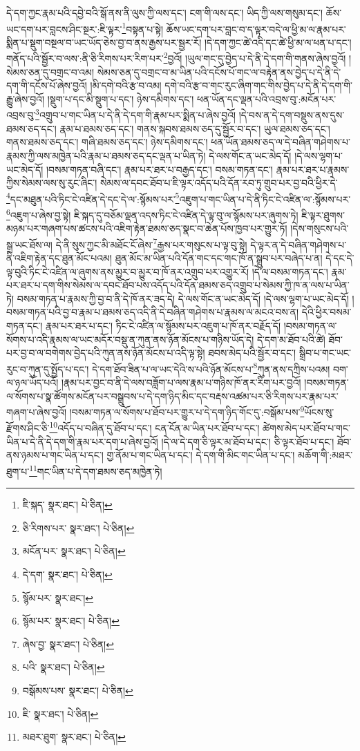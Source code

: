 དེ་དག་ཀྱང་རྣམ་པའི་དབྱེ་བའི་སྒོ་ནས་ནི་ལུས་ཀྱི་ལས་དང་། ངག་གི་ལས་དང་། ཡིད་ཀྱི་ལས་གསུམ་དང་། ཆོས་ཡང་དག་པར་བླངས་ཤིང་སྔར་:ཇི་ལྟར་\footnote{ཇི་སྐད་  སྣར་ཐང་།  པེ་ཅིན། }བསྟན་པ་སྟེ། ཆོས་ཡང་དག་པར་བླང་བ་ད་ལྟར་བདེ་ལ་ཕྱི་མ་ལ་རྣམ་པར་སྨིན་པ་སྡུག་བསྔལ་བ་ཡང་ཡོད་ཅེས་བྱ་བ་ནས་རྒྱས་པར་སྦྱར་རོ། །དེ་དག་ཀྱང་ཚེ་འདི་དང་ཚེ་ཕྱི་མ་ལ་ཕན་པ་དང་། གནོད་པའི་སྦྱོར་བ་ལས་:ནི་ཅི་རིགས་པར་རིག་པར་\footnote{ཅི་རིགས་པར་  སྣར་ཐང་།  པེ་ཅིན། }བྱའོ། །ཡུལ་གང་དུ་བྱེད་པ་དེ་ནི་དེ་དག་གི་གནས་ཞེས་བྱའོ། །སེམས་ཅན་དུ་བགྲང་བ་འམ། སེམས་ཅན་དུ་བགྲང་བ་མ་ཡིན་པའི་དངོས་པོ་གང་ལ་བརྟེན་ནས་བྱེད་པ་དེ་ནི་དེ་དག་གི་དངོས་པོ་ཞེས་བྱའོ། །མི་དགེ་བའི་རྩ་བ་འམ། དགེ་བའི་རྩ་བ་གང་རུང་ཞིག་གང་གིས་བྱེད་པ་དེ་ནི་དེ་དག་གི་རྒྱུ་ཞེས་བྱའོ། །སྡུག་པ་དང་མི་སྡུག་པ་དང་། ཉེས་དམིགས་དང་། ཕན་ཡོན་དང་ལྡན་པའི་འབྲས་བུ་:མངོན་པར་འབྲས་བུ་\footnote{མངོན་པར་  སྣར་ཐང་།  པེ་ཅིན། }འགྲུབ་པ་གང་ཡིན་པ་དེ་ནི་དེ་དག་གི་རྣམ་པར་སྨིན་པ་ཞེས་བྱའོ། །དེ་བས་ན་དེ་དག་བསྡུས་ནས་དུས་ཐམས་ཅད་དང་། རྣམ་པ་ཐམས་ཅད་དང་། གནས་སྐབས་ཐམས་ཅད་དུ་སྦྱོར་བ་དང་། ཡུལ་ཐམས་ཅད་དང་། གནས་ཐམས་ཅད་དང་། གཞི་ཐམས་ཅད་དང་། ཉེས་དམིགས་དང་། ཕན་ཡོན་ཐམས་ཅད་ལ་དེ་བཞིན་གཤེགས་པ་རྣམས་ཀྱི་ལས་མཁྱེན་པའི་རྣམ་པ་ཐམས་ཅད་དང་ལྡན་པ་ཡིན་ཏེ། དེ་ལས་གོང་ན་ཡང་མེད་དོ། །དེ་ལས་ལྷག་པ་ཡང་མེད་དོ། །བསམ་གཏན་བཞི་དང་། རྣམ་པར་ཐར་པ་བརྒྱད་དང་། བསམ་གཏན་དང་། རྣམ་པར་ཐར་པ་རྣམས་ཀྱིས་སེམས་ལས་སུ་རུང་ཞིང་། སེམས་ལ་དབང་ཐོབ་པ་ཇི་ལྟར་འདོད་པའི་དོན་རབ་ཏུ་གྲུབ་པར་བྱ་བའི་ཕྱིར་དེ་\footnote{དེ་དག་  སྣར་ཐང་།  པེ་ཅིན། }དང་མཐུན་པའི་ཏིང་ངེ་འཛིན་དེ་དང་དེ་ལ་:སྙོམས་པར་\footnote{སྙོམ་པར་  སྣར་ཐང་། }འཇུག་པ་གང་ཡིན་པ་དེ་ནི་ཏིང་ངེ་འཛིན་ལ་:སྙོམས་པར་\footnote{སྙོམ་པར་  སྣར་ཐང་།  པེ་ཅིན། }འཇུག་པ་ཞེས་བྱ་སྟེ། ཇི་སྐད་དུ་བཅོམ་ལྡན་འདས་ཏིང་ངེ་འཛིན་དེ་ལྟ་བུ་ལ་སྙོམས་པར་ཞུགས་ཏེ། ཇི་ལྟར་ཐུགས་མཉམ་པར་གཞག་པས་ཚངས་པའི་འཇིག་རྟེན་ཐམས་ཅད་སྣང་བ་ཆེན་པོས་ཁྱབ་པར་གྱུར་ཏོ། །དེས་གསུངས་པའི་སྒྲ་ཡང་ཐོས་ལ། དེ་ནི་སུས་ཀྱང་མི་མཐོང་ངོ་ཞེས་\footnote{ཞེས་བྱ་  སྣར་ཐང་།  པེ་ཅིན། }རྒྱས་པར་གསུངས་པ་ལྟ་བུ་སྟེ། དེ་ལྟར་ན་དེ་བཞིན་གཤེགས་པ་ནི་འཇིག་རྟེན་དང་ཐུན་མོང་པའམ། ཐུན་མོང་མ་ཡིན་པའི་དོན་གང་དང་གང་ཁོ་ན་སྒྲུབ་པར་བཞེད་པ་ན། དེ་དང་དེ་ལྟ་བུའི་ཏིང་ངེ་འཛིན་ལ་ཞུགས་ནས་མྱུར་བ་མྱུར་བ་ཁོ་ནར་འགྲུབ་པར་འགྱུར་རོ། །དེ་ལ་བསམ་གཏན་དང་། རྣམ་པར་ཐར་པ་དག་གིས་སེམས་ལ་དབང་ཐོབ་པས་འདོད་པའི་དོན་ཐམས་ཅད་འགྲུབ་པ་སེམས་ཀྱི་ཁ་ན་ལས་པ་ཡིན་ཏེ། བསམ་གཏན་པ་རྣམས་ཀྱི་བྱ་བ་ནི་དེ་ཁོ་ནར་ཟད་དེ། དེ་ལས་གོང་ན་ཡང་མེད་དོ། །དེ་ལས་ལྷག་པ་ཡང་མེད་དོ། །བསམ་གཏན་པའི་བྱ་བ་རྣམ་པ་ཐམས་ཅད་འདི་ནི་དེ་བཞིན་གཤེགས་པ་རྣམས་ལ་མངའ་བས་ན། དེའི་ཕྱིར་བསམ་གཏན་དང་། རྣམ་པར་ཐར་པ་དང་། ཏིང་ངེ་འཛིན་ལ་སྙོམས་པར་འཇུག་པ་ཁོ་ནར་བརྗོད་དོ། །བསམ་གཏན་ལ་སོགས་པ་འདི་རྣམས་ལ་ཡང་མདོར་བསྡུ་ན་ཀུན་ནས་ཉོན་མོངས་པ་གཉིས་ཡོད་དེ། དེ་དག་མ་ཐོབ་པའི་ཚེ། ཐོབ་པར་བྱ་བ་ལ་བགེགས་བྱེད་པའི་ཀུན་ནས་ཉོན་མོངས་པ་འདི་ལྟ་སྟེ། ཐབས་མེད་པའི་སྦྱོར་བ་དང་། སྒྲིབ་པ་གང་ཡང་རུང་བ་ཀུན་དུ་སྤྱོད་པ་དང་། དེ་དག་ཐོབ་ཟིན་པ་ལ་ཡང་དེའི་ས་པའི་ཉོན་མོངས་པ་\footnote{པའི་  སྣར་ཐང་།  པེ་ཅིན། }ཀུན་ནས་དཀྲིས་པའམ། བག་ལ་ཉལ་ཡོད་པའོ། །རྣམ་པར་བྱང་བ་ནི་དེ་ལས་བཟློག་པ་ལས་རྣམ་པ་གཉིས་ཁོ་ནར་རིག་པར་བྱའོ། །བསམ་གཏན་ལ་སོགས་པ་སྣ་ཚོགས་མངོན་པར་བསྒྲུབས་པ་དེ་དག་ཉིད་མིང་དང་བརྡས་འཚམ་པར་ཅི་རིགས་པར་རྣམ་པར་གཞག་པ་ཞེས་བྱའོ། །བསམ་གཏན་ལ་སོགས་པ་ཐོབ་པར་གྱུར་པ་དེ་དག་ཉིད་གོང་དུ་:བསྒོམ་པས་\footnote{བསྒོམས་པས་  སྣར་ཐང་།  པེ་ཅིན། }ཡོངས་སུ་རྫོགས་ཤིང་ཅི་\footnote{ཇི་  སྣར་ཐང་།  པེ་ཅིན། }འདོད་པ་བཞིན་དུ་ཐོབ་པ་དང་། ངན་ངོན་མ་ཡིན་པར་ཐོབ་པ་དང་། ཚེགས་མེད་པར་ཐོབ་པ་གང་ཡིན་པ་དེ་ནི་དེ་དག་གི་རྣམ་པར་དག་པ་ཞེས་བྱའོ། །དེ་ལ་དེ་དག་ཅི་ལྟར་མ་ཐོབ་པ་དང་། ཅི་ལྟར་ཐོབ་པ་དང་། ཐོབ་ནས་ཉམས་པ་གང་ཡིན་པ་དང་། གྱ་ནོམ་པ་གང་ཡིན་པ་དང་། དེ་དག་གི་མིང་གང་ཡིན་པ་དང་། མཆོག་གི་:མཐར་ཐུག་པ་\footnote{མཐར་ཐུག་  སྣར་ཐང་།  པེ་ཅིན། }གང་ཡིན་པ་དེ་དག་ཐམས་ཅད་མཁྱེན་ཏེ། 